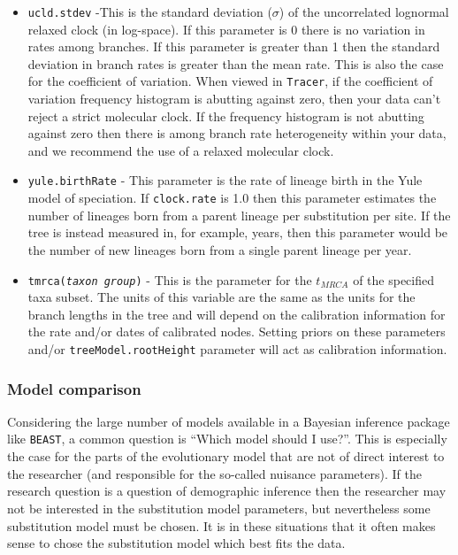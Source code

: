 \documentclass[cup7b, english]{cupbook}
\begin{document}
\begin{boxedminipage}{\textwidth}
{\begin{itemize}
\item \texttt{ucld.stdev} -This is the standard deviation ($\sigma$) of the uncorrelated lognormal relaxed
clock (in log-space). If this parameter is 0 there is no variation in rates among branches. If this parameter is greater
than 1 then the standard deviation in branch rates is greater than the mean rate. This is also the case for the
coefficient of variation.  When viewed in \texttt{Tracer}, if the coefficient of variation frequency histogram is abutting
against zero, then your data can't reject a strict molecular clock.  If the frequency histogram is not abutting against
zero then there is among branch rate heterogeneity within your data, and we recommend the use of a relaxed molecular
clock.

\item \texttt{yule.birthRate} - This parameter is the rate of lineage birth in the Yule model of speciation. If
\texttt{clock.rate} is 1.0 then this parameter estimates the number of lineages born from a parent lineage per substitution
per site. If the tree is instead measured in, for example, years, then this parameter would be the number of new lineages
born from a single parent lineage per year.

\item \texttt{tmrca({\it taxon group})} - This is the parameter for the $t_{MRCA}$ of the specified taxa
subset. The units of this variable are the same as the units for the branch
lengths in the tree and will depend on the calibration information for the rate and/or dates of calibrated nodes.
Setting priors on these parameters and/or \texttt{treeModel.rootHeight} parameter will act as calibration information.
\end{itemize}
}
\end{boxedminipage}

\subsubsection{Model comparison}

Considering the large number of models available in a Bayesian inference package like \texttt{BEAST}, a common question is
``Which model should I use?''. This is especially the case for the parts of the evolutionary model that are not of
direct interest to the researcher (and responsible for the so-called nuisance parameters). If the research question
is a question of demographic inference then the researcher may not be interested in the substitution model parameters,
but nevertheless some substitution model must be chosen. It is in these situations that it often makes sense to chose
the substitution model which best fits the data.
\end{document}
